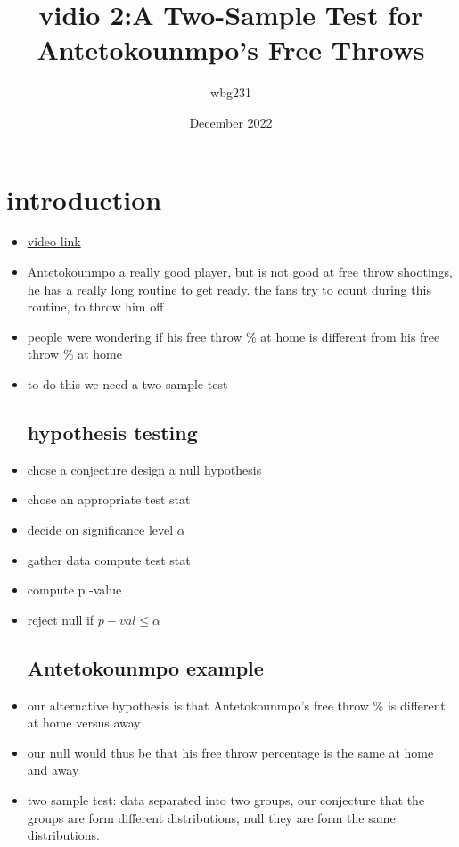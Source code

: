 \documentclass{article}
\title{vidio 2:A Two-Sample Test for Antetokounmpo's Free Throws}
\author{wbg231 }
\date{December 2022}
\begin{document}
\maketitle

\section{introduction}
\begin{itemize}
\item \href{https://www.youtube.com/watch?v=j3hTudQvM2o&list=PLBEf5mJtE6KuZ5NBQMuWIMsiOOrV9ibzm&index=79}{video link}
\item Antetokounmpo a really good player, but is not good at free throw shootings, he has a really long routine to get ready. the fans try to count during this routine, to throw him off
\item people were wondering if his free throw \% at home is different from his free throw \% at home
\item to do this we need a two sample test 
\subsection{hypothesis testing}
\item chose a conjecture 
\itme design a null hypothesis 
\item chose an appropriate test stat 
\item decide on significance level $\alpha$
\item gather data compute test stat 
\item compute p -value 
\item reject null if $p-val\leq \alpha$
\subsection{Antetokounmpo example}
\item our alternative hypothesis is that Antetokounmpo's free throw \% is different at home versus away
\item our null would thus be that his free throw percentage is the same at home and away
\item two sample test: data separated into two groups, our conjecture that the groups are form different distributions, null they are form the same distributions.

\end{itemize}
\end{document}
